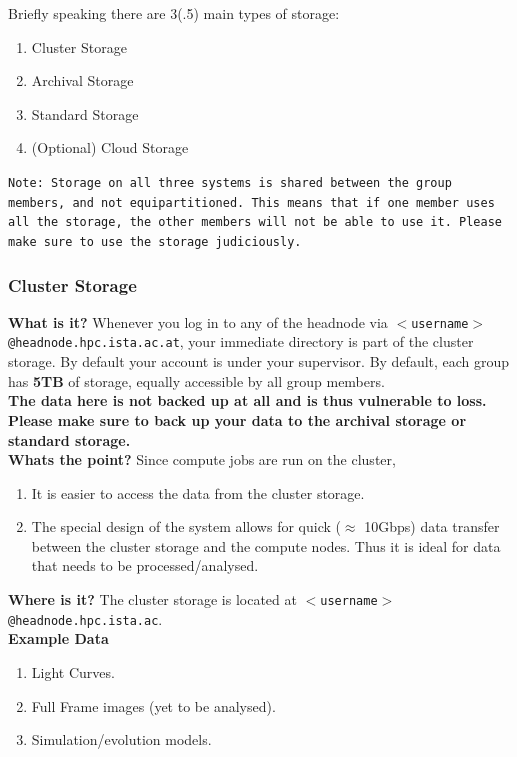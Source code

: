 \documentclass{article}
\begin{document}
Briefly speaking there are 3(.5) main types of storage:
\begin{enumerate}
    \item Cluster Storage
    \item Archival Storage
    \item Standard Storage
    \item (Optional) Cloud Storage
\end{enumerate}

\texttt{Note: Storage on all three systems is shared between the group members, and not equipartitioned. This means that if one member uses all the storage, the other members will not be able to use it. Please make sure to use the storage judiciously.}
\subsubsection{Cluster Storage}
\textbf{What is it?}
\newline
Whenever you log in to any of the headnode via \texttt{$<$username$>$@headnode.hpc.ista.ac.at}, your immediate directory is part of the cluster storage. By default your account is under your supervisor. By default, each group has \textbf{5TB} of storage, equally accessible by all group members.
\\
\textbf{The data here is not backed up at all and is thus vulnerable to loss. Please make sure to back up your data to the archival storage or standard storage.}
\\

\noindent
\textbf{Whats the point?}
\newline
Since compute jobs are run on the cluster, 
\begin{enumerate}
    \item It is easier to access the data from the cluster storage.
    \item The special design of the system allows for quick ($\approx$ 10Gbps) data transfer between the cluster storage and the compute nodes. Thus it is ideal for data that needs to be processed/analysed.
\end{enumerate}

\noindent
\textbf{Where is it?}
\newline
The cluster storage is located at \texttt{$<$username$>$@headnode.hpc.ista.ac}.
\\

\noindent
\textbf{Example Data}
\begin{enumerate}
    \item Light Curves.
    \item Full Frame images (yet to be analysed).
    \item Simulation/evolution models.
\end{enumerate}
\end{document}
